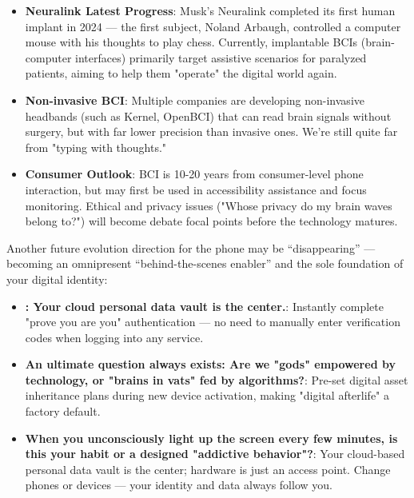 \begin{itemize}
  \item \textbf{Neuralink Latest Progress}: Musk's Neuralink completed its first human implant in 2024 — the first subject, Noland Arbaugh, controlled a computer mouse with his thoughts to play chess. Currently, implantable BCIs (brain-computer interfaces) primarily target assistive scenarios for paralyzed patients, aiming to help them "operate" the digital world again.
  \item \textbf{Non-invasive BCI}: Multiple companies are developing non-invasive headbands (such as Kernel, OpenBCI) that can read brain signals without surgery, but with far lower precision than invasive ones. We're still quite far from "typing with thoughts."
  \item \textbf{Consumer Outlook}: BCI is 10-20 years from consumer-level phone interaction, but may first be used in accessibility assistance and focus monitoring. Ethical and privacy issues ("Whose privacy do my brain waves belong to?") will become debate focal points before the technology matures.
\end{itemize}


Another future evolution direction for the phone may be “disappearing” — becoming an omnipresent “behind-the-scenes enabler” and the sole foundation of your digital identity:

\begin{itemize}
  \item \textbf{: Your cloud personal data vault is the center.}: Instantly complete "prove you are you" authentication — no need to manually enter verification codes when logging into any service.
  \item \textbf{An ultimate question always exists: Are we "gods" empowered by technology, or "brains in vats" fed by algorithms?}: Pre-set digital asset inheritance plans during new device activation, making "digital afterlife" a factory default.
  \item \textbf{When you unconsciously light up the screen every few minutes, is this your habit or a designed "addictive behavior"?}: Your cloud-based personal data vault is the center; hardware is just an access point. Change phones or devices — your identity and data always follow you.
\end{itemize}


